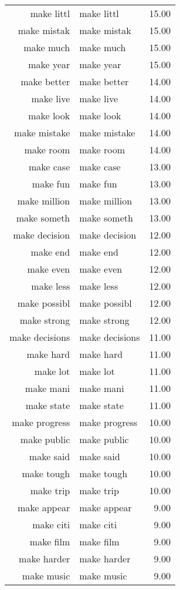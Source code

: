 \begin{table}[ht]
\begin{tabular}{rlr}
  make littl & make littl & 15.00 \\ 
  make mistak & make mistak & 15.00 \\ 
  make much & make much & 15.00 \\ 
  make year & make year & 15.00 \\ 
  make better & make better & 14.00 \\ 
  make live & make live & 14.00 \\ 
  make look & make look & 14.00 \\ 
  make mistake & make mistake & 14.00 \\ 
  make room & make room & 14.00 \\ 
  make case & make case & 13.00 \\ 
  make fun & make fun & 13.00 \\ 
  make million & make million & 13.00 \\ 
  make someth & make someth & 13.00 \\ 
  make decision & make decision & 12.00 \\ 
  make end & make end & 12.00 \\ 
  make even & make even & 12.00 \\ 
  make less & make less & 12.00 \\ 
  make possibl & make possibl & 12.00 \\ 
  make strong & make strong & 12.00 \\ 
  make decisions & make decisions & 11.00 \\ 
  make hard & make hard & 11.00 \\ 
  make lot & make lot & 11.00 \\ 
  make mani & make mani & 11.00 \\ 
  make state & make state & 11.00 \\ 
  make progress & make progress & 10.00 \\ 
  make public & make public & 10.00 \\ 
  make said & make said & 10.00 \\ 
  make tough & make tough & 10.00 \\ 
  make trip & make trip & 10.00 \\ 
  make appear & make appear & 9.00 \\ 
  make citi & make citi & 9.00 \\ 
  make film & make film & 9.00 \\ 
  make harder & make harder & 9.00 \\ 
  make music & make music & 9.00 \\ 

\end{tabular}
\end{table}
